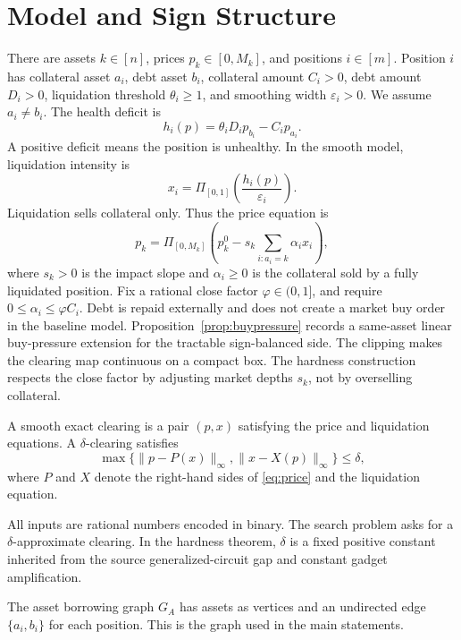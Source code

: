 \documentclass{llncs}
\newcommand{\clip}{\Pi}
\newcommand{\GA}{G_A}
\newcommand{\eps}{\varepsilon}
\begin{document}
\section{Model and Sign Structure}
\label{sec:model}
There are assets \(k\in[n]\), prices \(p_k\in[0,M_k]\), and positions \(i\in[m]\). Position \(i\) has collateral asset \(a_i\), debt asset \(b_i\), collateral amount \(C_i>0\), debt amount \(D_i>0\), liquidation threshold \(\theta_i\ge 1\), and smoothing width \(\eps_i>0\). We assume \(a_i\ne b_i\). The health deficit is
\begin{equation}
  h_i(p)=\theta_iD_i p_{b_i}-C_i p_{a_i}.
\end{equation}
A positive deficit means the position is unhealthy. In the smooth model, liquidation intensity is
\begin{equation}
  x_i=\clip_{[0,1]}\!\left(\frac{h_i(p)}{\eps_i}\right).
\end{equation}
Liquidation sells collateral only. Thus the price equation is
\begin{equation}
  p_k=\clip_{[0,M_k]}\!\left(p_k^0-s_k\sum_{i:a_i=k}\alpha_i x_i\right),
  \label{eq:price}
\end{equation}
where \(s_k>0\) is the impact slope and \(\alpha_i\ge0\) is the collateral sold by a fully liquidated position. Fix a rational close factor \(\varphi\in(0,1]\), and require \(0\le\alpha_i\le\varphi C_i\). Debt is repaid externally and does not create a market buy order in the baseline model. Proposition~\ref{prop:buypressure} records a same-asset linear buy-pressure extension for the tractable sign-balanced side. The clipping makes the clearing map continuous on a compact box. The hardness construction respects the close factor by adjusting market depths \(s_k\), not by overselling collateral.

A smooth exact clearing is a pair \((p,x)\) satisfying the price and liquidation equations. A \(\delta\)-clearing satisfies
\[
  \max\{\|p-P(x)\|_\infty,\|x-X(p)\|_\infty\}\le \delta,
\]
where \(P\) and \(X\) denote the right-hand sides of \eqref{eq:price} and the liquidation equation.

All inputs are rational numbers encoded in binary. The search problem asks for a \(\delta\)-approximate clearing. In the hardness theorem, \(\delta\) is a fixed positive constant inherited from the source generalized-circuit gap and constant gadget amplification.

The asset borrowing graph \(\GA\) has assets as vertices and an undirected edge \(\{a_i,b_i\}\) for each position. This is the graph used in the main statements.
\end{document}
